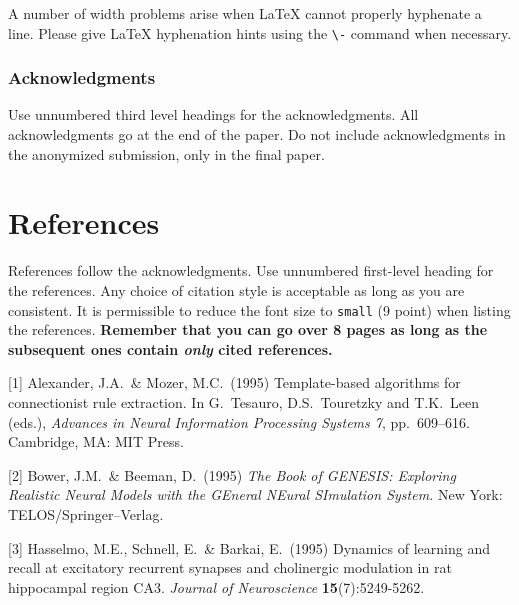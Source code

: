 \documentclass{article}
\begin{document}
A number of width problems arise when \LaTeX{} cannot properly
hyphenate a line. Please give LaTeX hyphenation hints using the
\verb+\-+ command when necessary.

\subsubsection*{Acknowledgments}

Use unnumbered third level headings for the acknowledgments. All
acknowledgments go at the end of the paper. Do not include
acknowledgments in the anonymized submission, only in the final paper.

\section*{References}

References follow the acknowledgments. Use unnumbered first-level
heading for the references. Any choice of citation style is acceptable
as long as you are consistent. It is permissible to reduce the font
size to \verb+small+ (9 point) when listing the references. {\bf
  Remember that you can go over 8 pages as long as the subsequent ones contain
  \emph{only} cited references.}
\medskip

\small

[1] Alexander, J.A.\ \& Mozer, M.C.\ (1995) Template-based algorithms
for connectionist rule extraction. In G.\ Tesauro, D.S.\ Touretzky and
T.K.\ Leen (eds.), {\it Advances in Neural Information Processing
  Systems 7}, pp.\ 609--616. Cambridge, MA: MIT Press.

[2] Bower, J.M.\ \& Beeman, D.\ (1995) {\it The Book of GENESIS:
  Exploring Realistic Neural Models with the GEneral NEural SImulation
  System.}  New York: TELOS/Springer--Verlag.

[3] Hasselmo, M.E., Schnell, E.\ \& Barkai, E.\ (1995) Dynamics of
learning and recall at excitatory recurrent synapses and cholinergic
modulation in rat hippocampal region CA3. {\it Journal of
  Neuroscience} {\bf 15}(7):5249-5262.




\end{document}

